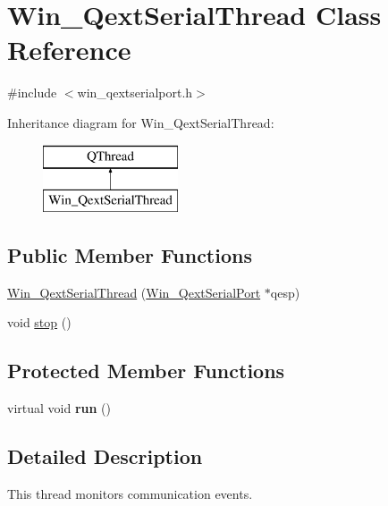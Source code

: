 \hypertarget{class_win___qext_serial_thread}{}\section{Win\+\_\+\+Qext\+Serial\+Thread Class Reference}
\label{class_win___qext_serial_thread}


{\ttfamily \#include $<$win\+\_\+qextserialport.\+h$>$}

Inheritance diagram for Win\+\_\+\+Qext\+Serial\+Thread\+:\begin{figure}[H]
\begin{center}
\leavevmode
\includegraphics[height=2.000000cm]{class_win___qext_serial_thread}
\end{center}
\end{figure}
\subsection*{Public Member Functions}
\begin{DoxyCompactItemize}
\item 
\mbox{\hyperlink{class_win___qext_serial_thread_aaf0e9331f2cc235ba93b1f678d918a6e}{Win\+\_\+\+Qext\+Serial\+Thread}} (\mbox{\hyperlink{class_win___qext_serial_port}{Win\+\_\+\+Qext\+Serial\+Port}} $\ast$qesp)
\item 
void \mbox{\hyperlink{class_win___qext_serial_thread_a36989d3d8cf24965092ce32bba8387d2}{stop}} ()
\end{DoxyCompactItemize}
\subsection*{Protected Member Functions}
\begin{DoxyCompactItemize}
\item 
\mbox{\label{class_win___qext_serial_thread_af4ae3e3d433e5cfe39437bc8ef1f07cc}} 
virtual void {\bfseries run} ()
\end{DoxyCompactItemize}


\subsection{Detailed Description}
This thread monitors communication events. 

